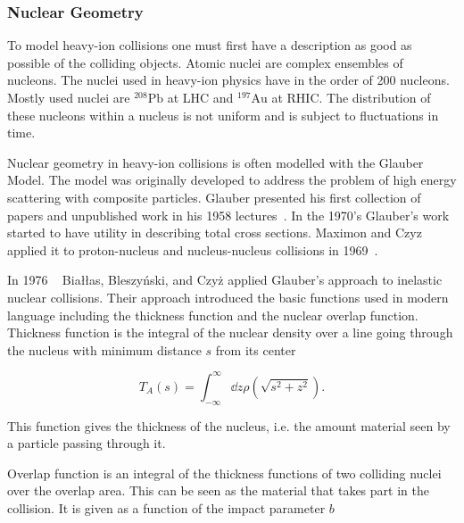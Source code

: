 

\subsubsection{Nuclear Geometry}
\label{sec:glauber}
To model heavy-ion collisions one must first have a description as good as possible of the colliding objects. Atomic nuclei are complex ensembles of nucleons. The nuclei used in heavy-ion physics have in the order of 200 nucleons. Mostly used nuclei are $\mathrm{^{208}Pb}$ at LHC and $\mathrm{^{197}Au}$ at RHIC. The distribution of these nucleons within a nucleus is not uniform and is subject to fluctuations in time.

Nuclear geometry in heavy-ion collisions is often modelled with the Glauber Model. The model was originally developed to address the problem of high energy scattering with composite particles. Glauber presented his first collection of papers and unpublished work in his 1958 lectures~\cite{Glauber:1959}. In the 1970's Glauber's work started to have utility in describing total cross sections. Maximon and Czyz applied it to proton-nucleus and nucleus-nucleus collisions in 1969~\cite{Czyz:1969}. 

In 1976 ~\cite{Biallas1976461} Białłas, Bleszyński, and Czyż applied Glauber's approach to inelastic nuclear collisions. Their approach introduced the basic functions used in modern language including the thickness function and the nuclear overlap function. Thickness function is the integral of the nuclear density over a line going through the nucleus with minimum distance $s$ from its center

\begin{equation}
T_A\left(s\right)=\int_{-\infty}^{\infty}\dd z \rho\left(\sqrt{s^2+z^2}\right).
\end{equation}

\noindent This function gives the thickness of the nucleus, i.e. the amount material seen by a particle passing through it. 

Overlap function is an integral of the thickness functions of two colliding nuclei over the overlap area. This can be seen as the material that takes part in the collision. It is given as a function of the impact parameter $b$

